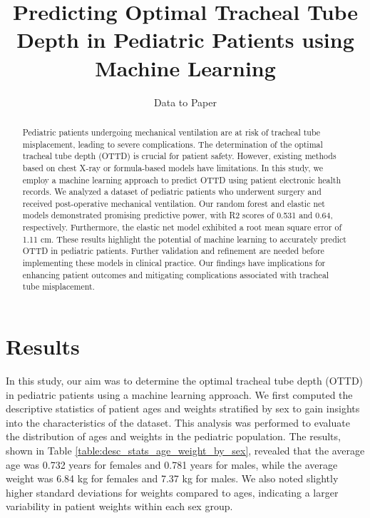 \documentclass[11pt]{article}
\title{Predicting Optimal Tracheal Tube Depth in Pediatric Patients using Machine Learning}
\author{Data to Paper}
\begin{document}
\maketitle
\begin{abstract}
Pediatric patients undergoing mechanical ventilation are at risk of tracheal tube misplacement, leading to severe complications. The determination of the optimal tracheal tube depth (OTTD) is crucial for patient safety. However, existing methods based on chest X-ray or formula-based models have limitations. In this study, we employ a machine learning approach to predict OTTD using patient electronic health records. We analyzed a dataset of pediatric patients who underwent surgery and received post-operative mechanical ventilation. Our random forest and elastic net models demonstrated promising predictive power, with R2 scores of 0.531 and 0.64, respectively. Furthermore, the elastic net model exhibited a root mean square error of 1.11 cm. These results highlight the potential of machine learning to accurately predict OTTD in pediatric patients. Further validation and refinement are needed before implementing these models in clinical practice. Our findings have implications for enhancing patient outcomes and mitigating complications associated with tracheal tube misplacement.
\end{abstract}
\section*{Results}

In this study, our aim was to determine the optimal tracheal tube depth (OTTD) in pediatric patients using a machine learning approach. We first computed the descriptive statistics of patient ages and weights stratified by sex to gain insights into the characteristics of the dataset. This analysis was performed to evaluate the distribution of ages and weights in the pediatric population. The results, shown in Table {}\ref{table:desc_stats_age_weight_by_sex}, revealed that the average age was 0.732 years for females and 0.781 years for males, while the average weight was 6.84 kg for females and 7.37 kg for males. We also noted slightly higher standard deviations for weights compared to ages, indicating a larger variability in patient weights within each sex group.
\end{document}
